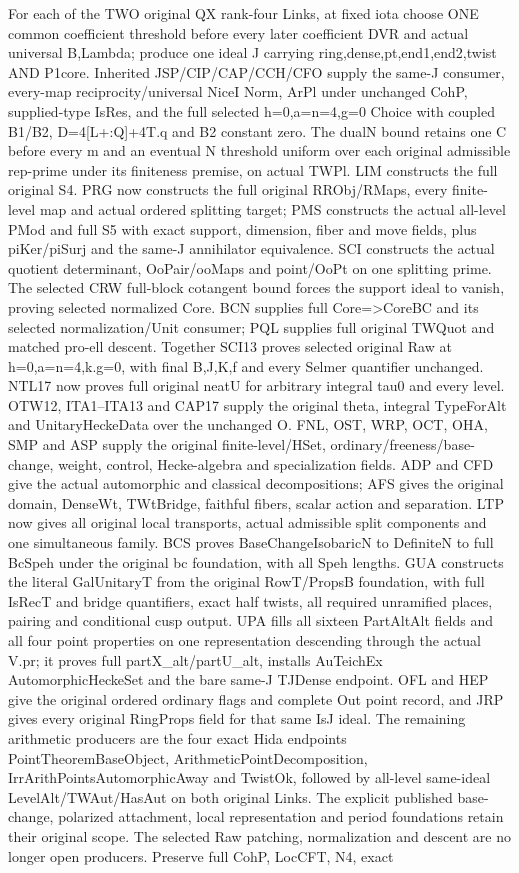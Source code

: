 For each of the TWO original QX rank-four Links, at fixed iota choose ONE common coefficient threshold before every later coefficient DVR and actual universal B,Lambda; produce one ideal J carrying ring,dense,pt,end1,end2,twist AND P1core. Inherited JSP/CIP/CAP/CCH/CFO supply the same-J consumer, every-map reciprocity/universal NiceI Norm, ArPl under unchanged CohP, supplied-type IsRes, and the full selected h=0,a=n=4,g=0 Choice with coupled B1/B2, D=4[L+:Q]+4T.q and B2 constant zero. The dualN bound retains one C before every m and an eventual N threshold uniform over each original admissible rep-prime under its finiteness premise, on actual TWPl. LIM constructs the full original S4. PRG now constructs the full original RRObj/RMaps, every finite-level map and actual ordered splitting target; PMS constructs the actual all-level PMod and full S5 with exact support, dimension, fiber and move fields, plus piKer/piSurj and the same-J annihilator equivalence. SCI constructs the actual quotient determinant, OoPair/ooMaps and point/OoPt on one splitting prime. The selected CRW full-block cotangent bound forces the support ideal to vanish, proving selected normalized Core. BCN supplies full Core=>CoreBC and its selected normalization/Unit consumer; PQL supplies full original TWQuot and matched pro-ell descent. Together SCI13 proves selected original Raw at h=0,a=n=4,k.g=0, with final B,J,K,f and every Selmer quantifier unchanged. NTL17 now proves full original neatU for arbitrary integral tau0 and every level. OTW12, ITA1–ITA13 and CAP17 supply the original theta, integral TypeForAlt and UnitaryHeckeData over the unchanged O. FNL, OST, WRP, OCT, OHA, SMP and ASP supply the original finite-level/HSet, ordinary/freeness/base-change, weight, control, Hecke-algebra and specialization fields. ADP and CFD give the actual automorphic and classical decompositions; AFS gives the original domain, DenseWt, TWtBridge, faithful fibers, scalar action and separation. LTP now gives all original local transports, actual admissible split components and one simultaneous family. BCS proves BaseChangeIsobaricN to DefiniteN to full BcSpeh under the original bc foundation, with all Speh lengths. GUA constructs the literal GalUnitaryT from the original RowT/PropsB foundation, with full IsRecT and bridge quantifiers, exact half twists, all required unramified places, pairing and conditional cusp output. UPA fills all sixteen PartAltAlt fields and all four point properties on one representation descending through the actual V.pr; it proves full partX\_\allowbreak alt/partU\_\allowbreak alt, installs AuTeichEx AutomorphicHeckeSet and the bare same-J TJDense endpoint. OFL and HEP give the original ordered ordinary flags and complete Out point record, and JRP gives every original RingProps field for that same IsJ ideal. The remaining arithmetic producers are the four exact Hida endpoints PointTheoremBaseObject, ArithmeticPointDecomposition, IrrArithPointsAutomorphicAway and TwistOk, followed by all-level same-ideal LevelAlt/TWAut/HasAut on both original Links. The explicit published base-change, polarized attachment, local representation and period foundations retain their original scope. The selected Raw patching, normalization and descent are no longer open producers. Preserve full CohP, LocCFT, N4, exact 